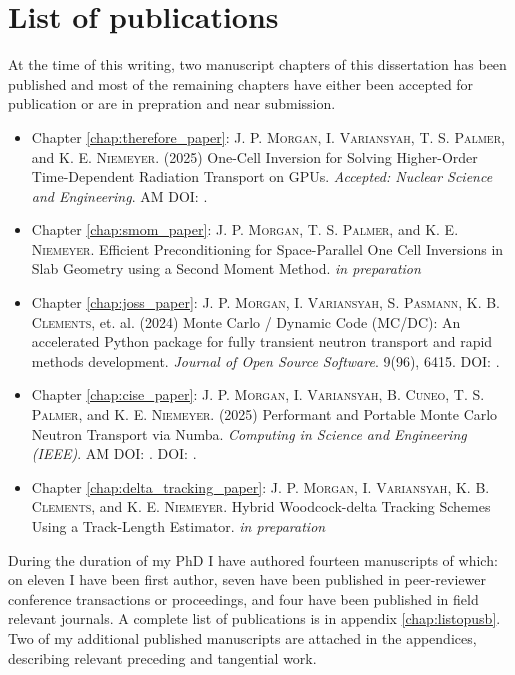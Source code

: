\section{List of publications}

At the time of this writing, two manuscript chapters of this dissertation has been published and most of the remaining chapters have either been accepted for publication or are in prepration and near submission.
\begin{itemize}
    \item Chapter \ref{chap:therefore_paper}: \textsc{J. P. Morgan}, \textsc{I. Variansyah}, \textsc{T. S. Palmer}, and \textsc{K. E. Niemeyer}. (2025) One-Cell Inversion for Solving Higher-Order Time-Dependent Radiation Transport on GPUs. \emph{Accepted: Nuclear Science and Engineering}. AM DOI: .

    \item Chapter \ref{chap:smom_paper}: \textsc{J. P. Morgan},  \textsc{T. S. Palmer}, and \textsc{K. E. Niemeyer}. Efficient Preconditioning for Space-Parallel One Cell Inversions in Slab Geometry using a Second Moment Method. \emph{in preparation}

    \item Chapter \ref{chap:joss_paper}: \textsc{J. P. Morgan}, \textsc{I. Variansyah}, \textsc{S. Pasmann}, \textsc{K. B. Clements}, et. al. (2024) Monte Carlo / Dynamic Code (MC/DC): An accelerated Python package for fully transient neutron transport and rapid methods development. \emph{Journal of Open Source Software}. 9(96), 6415. DOI: .

    \item Chapter \ref{chap:cise_paper}: \textsc{J. P. Morgan}, \textsc{I. Variansyah}, \textsc{B. Cuneo}, \textsc{T. S. Palmer}, and \textsc{K. E. Niemeyer}. (2025) Performant and Portable Monte Carlo Neutron Transport via Numba. \emph{Computing in Science and Engineering (IEEE)}. AM DOI: . DOI: .

    \item Chapter \ref{chap:delta_tracking_paper}: \textsc{J. P. Morgan}, \textsc{I. Variansyah}, \textsc{K. B. Clements}, and \textsc{K. E. Niemeyer}. Hybrid Woodcock-delta Tracking Schemes Using a Track-Length Estimator. \emph{in preparation}
    
\end{itemize}

During the duration of my PhD I have authored fourteen manuscripts of which: on eleven I have been first author, seven have been published in peer-reviewer conference transactions or proceedings, and four have been published in field relevant journals.
A complete list of publications is in appendix \ref{chap:listopusb}.
Two of my additional published manuscripts are attached in the appendices, describing relevant preceding and tangential work.